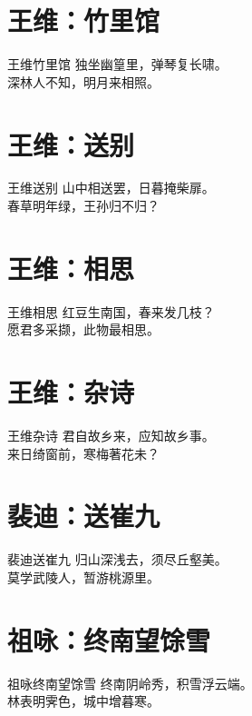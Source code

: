 \documentclass[12pt,oneside,a5paper]{book}
\begin{document}
\chapter{王维：竹里馆}
\begin{poemzh}{王维}{竹里馆}
独坐幽篁里，弹琴复长啸。\\
深林人不知，明月来相照。\\ 
\end{poemzh}

\chapter{王维：送别}
\begin{poemzh}{王维}{送别}
山中相送罢，日暮掩柴扉。\\
春草明年绿，王孙归不归？\\ 
\end{poemzh}

\chapter{王维：相思}
\begin{poemzh}{王维}{相思}
红豆生南国，春来发几枝？\\
愿君多采撷，此物最相思。\\ 
\end{poemzh}

\chapter{王维：杂诗}
\begin{poemzh}{王维}{杂诗}
君自故乡来，应知故乡事。\\
来日绮窗前，寒梅著花未？\\ 
\end{poemzh}

\chapter{裴迪：送崔九}
\begin{poemzh}{裴迪}{送崔九}
归山深浅去，须尽丘壑美。\\
莫学武陵人，暂游桃源里。\\ 
\end{poemzh}

\chapter{祖咏：终南望馀雪}
\begin{poemzh}{祖咏}{终南望馀雪}
终南阴岭秀，积雪浮云端。\\
林表明霁色，城中增暮寒。\\ 
\end{poemzh}
\end{document}
